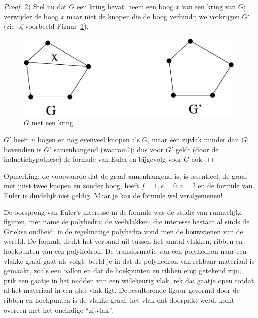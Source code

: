 \begin{proof}
2) Stel nu dat $G$ een kring bevat: neem een boog $x$ van een kring van $G$;
verwijder de boog $x$ maar niet de knopen die de boog verbindt; we
verkrijgen $G'$ (zie bijvoorbeeld Figuur~\ref{euler3}). 
\begin{figure}[ht]
\begin{center}
\includegraphics[width=0.4\linewidth,keepaspectratio]{euler3}
\end{center}
\caption{$G$ met een kring \label{euler3}}
\end{figure}
$G'$ heeft $n$ bogen
en nog evenveel knopen als $G$, maar \'{e}\'{e}n zijvlak minder dan $G$;
bovendien is $G'$ samenhangend (waarom?); dus voor
$G'$ geldt (door de inductiehypothese) de formule van Euler en bijgevolg
voor $G$ ook.
\end{proof}

Opmerking: de voorwaarde dat de graaf samenhangend is, is essentieel;
de graaf met juist twee knopen en zonder boog, heeft $f = 1, e = 0, v
= 2$ en de formule van Euler is duidelijk niet geldig. Maar je kan de
formule wel veralgemenen!

De oorsprong van Euler's interesse in de formule was de studie van
ruimtelijke figuren, met name de polyhedra: de veelvlakken; die
interesse bestaat al sinds de Griekse oudheid: in de regelmatige
polyhedra vond men de bouwstenen van de wereld. De formule drukt het
verband uit tussen het aantal vlakken, ribben en hoekpunten van een
polyhedron. De transformatie van een polyhedron naar een vlakke graaf
gaat als volgt: beeld je in dat de polyhedron van rekbaar materiaal is
gemaakt, zoals een ballon en dat de hoekpunten en ribben erop getekend
zijn; prik een gaatje in het midden van een willekeurig vlak, rek dat
gaatje open totdat al het materiaal in een plat vlak ligt. De
resulterende figuur gevormd door de ribben en hoekpunten is de vlakke
graaf; het vlak dat doorprikt werd, komt overeen met het oneindige
``zijvlak''.

